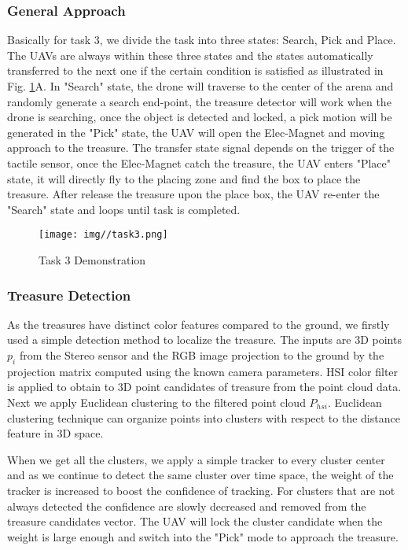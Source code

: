 \documentclass{standalone}
\begin{document}
\subsubsection{General Approach}
Basically for task 3, we divide the task into three states: Search, Pick and Place. The UAVs are always within these three states and the states automatically transferred to the next one if the certain condition is satisfied as illustrated in Fig. \ref{t3}A. In "Search" state, the drone will traverse to the center of the arena and randomly generate a search end-point, the treasure detector will work when the drone is searching, once the object is detected and locked, a pick motion will be generated in the "Pick" state, the UAV will open the Elec-Magnet and moving approach to the treasure. The transfer state signal depends on the trigger of the tactile sensor, once the Elec-Magnet catch the treasure, the UAV enters "Place" state, it will directly fly to the placing zone and find the box to place the treasure. After release the treasure upon the place box, the UAV re-enter the "Search" state and loops until task is completed.

 \begin{figure}%
    \begin{center}
      \texttt{[image: img//task3.png]}
    \end{center}
    \caption{Task 3 Demonstration}
    \label{t3}
  \end{figure}


\subsubsection{Treasure Detection}
As the treasures have distinct color features compared to the ground, we firstly used a simple detection method to localize the treasure. 
The inputs are 3D points $p_i$ from the Stereo sensor and the RGB image projection to the ground by the projection matrix computed using the known camera parameters. %
HSI color filter is applied to obtain to 3D point candidates of treasure from the point cloud data. Next we apply Euclidean clustering to the filtered point cloud $P_{hsi}$. Euclidean clustering technique can organize points into clusters with respect to the distance feature in 3D space. 

When we get all the clusters, we apply a simple tracker to every cluster center and as we continue to detect the same cluster over time space, the weight of the tracker is increased to boost the confidence of tracking. For clusters that are not always detected the confidence are slowly decreased and removed from the treasure candidates vector. The UAV will lock the cluster candidate when the weight is large enough and switch into the "Pick" mode to approach the treasure.
\end{document}
